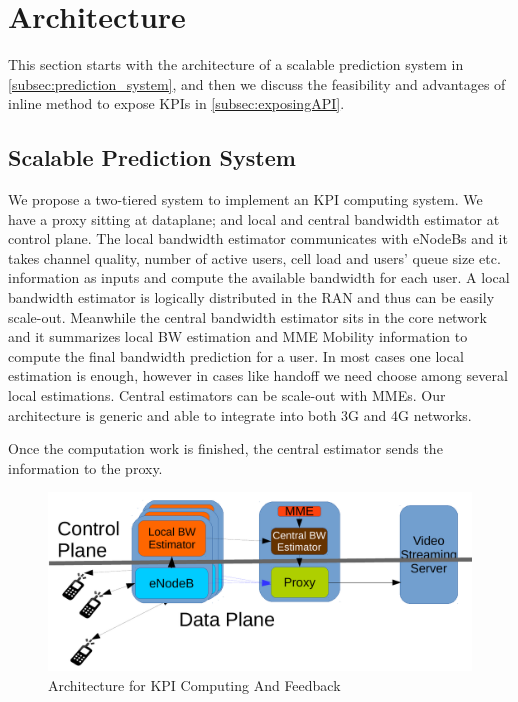 
\section{Architecture} \label{sec:Architecture}
This section starts with the architecture of a scalable prediction system in
\autoref{subsec:prediction_system}, and then we discuss the feasibility and
advantages of inline method to expose KPIs in \autoref{subsec:exposingAPI}.
\subsection{Scalable Prediction System} \label{subsec:prediction_system} We
propose a two-tiered system to implement an KPI computing system. We have a
proxy sitting at dataplane; and local and central bandwidth estimator at control
plane. The local bandwidth estimator communicates with eNodeBs and it takes
channel quality, number of active users, cell load and users' queue size etc.
information as inputs and compute the available bandwidth for each user. A local
bandwidth estimator is logically distributed in the RAN and thus can be easily
scale-out. Meanwhile the central bandwidth estimator sits in the core network
and it summarizes local BW estimation and MME Mobility information to compute
the final bandwidth prediction for a user. In most cases one local estimation is
enough, however in cases like handoff we need choose among several local
estimations. Central estimators can be
scale-out with MMEs. Our architecture is generic and able to integrate into both
3G and 4G networks. 

Once the computation work is finished, the central estimator sends the
information to the proxy. 
 
\begin{figure}[tb]\label{fig:Architecture}
 \includegraphics[width=\linewidth]{architecture2.pdf}
 \caption{Architecture for KPI Computing And Feedback}
\end{figure}


